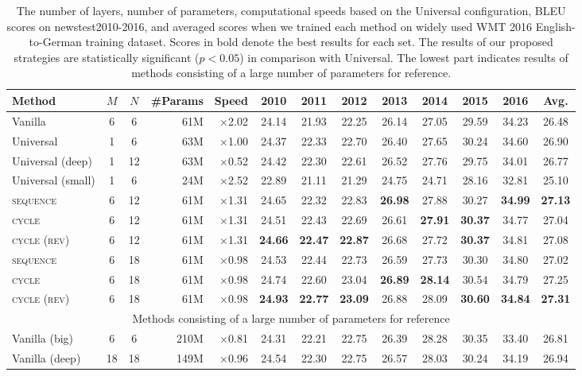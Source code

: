 \documentclass[11pt]{article}
\begin{document}
\begin{table*}[!t]
  \centering{}
  \footnotesize
  \begin{tabular}{ l | c c | r | r | c c c c c c c | c} \hline
  Method & $M$ & $N$ & \multicolumn{1}{c|}{\#Params} & Speed & 2010 & 2011 & 2012 & 2013 & 2014 & 2015 & 2016 & Avg. \\ \hline \hline
  Vanilla & 6 & 6 & 61M & $\times$2.02 & 24.14 & 21.93 & 22.25 & 26.14 & 27.05 & 29.59 & 34.23 & 26.48 \\
  Universal & 1 & 6 & 63M & $\times$1.00 & 24.37 & 22.33 & 22.70 & 26.40 & 27.65 & 30.24 & 34.60 & 26.90 \\
  Universal (deep) & 1 & 12 & 63M & $\times$0.52 & 24.42 & 22.30 & 22.61 & 26.52 & 27.76 & 29.75 & 34.01 & 26.77 \\
  Universal (small) & 1 & 6 & 24M & $\times$2.52 & 22.89 & 21.11 & 21.29 & 24.75 & 24.71 & 28.16 & 32.81 & 25.10 \\
  \textsc{sequence} & 6 & 12 & 61M & $\times$1.31 & 24.65 & 22.32 & 22.83 & \textbf{26.98} & 27.88 & 30.27 & \textbf{34.99} & \textbf{27.13} \\  
  \textsc{cycle} & 6 & 12 & 61M & $\times$1.31 & 24.51 & 22.43 & 22.69 & 26.61 & \textbf{27.91} & \textbf{30.37} & 34.77 & 27.04 \\
  \textsc{cycle (rev)} & 6 & 12 & 61M & $\times$1.31 & \textbf{24.66} & \textbf{22.47} & \textbf{22.87} & 26.68 & 27.72 & \textbf{30.37} & 34.81 & 27.08 \\ \hline
  \textsc{sequence} & 6 & 18 & 61M & $\times$0.98 & 24.53 & 22.44 & 22.73 & 26.59 & 27.73 & 30.30 & 34.80 & 27.02 \\
  \textsc{cycle} & 6 & 18 & 61M & $\times$0.98 & 24.74 & 22.60 & 23.04 & \textbf{26.89} & \textbf{28.14} & 30.54 & 34.79 & 27.25 \\
  \textsc{cycle (rev)} & 6 & 18 & 61M & $\times$0.98 & \textbf{24.93} & \textbf{22.77} & \textbf{23.09} & 26.88 & 28.09 & \textbf{30.60} & \textbf{34.84} & \textbf{27.31} \\ \hline \hline
  \multicolumn{13}{c}{Methods consisting of a large number of parameters for reference} \\ \hline \hline
  Vanilla (big) & 6 & 6 & 210M & $\times$0.81 & 24.31 & 22.21 & 22.75 & 26.39 & 28.28 & 30.35 & 33.40 & 26.81 \\
  Vanilla (deep) & 18 & 18 & 149M & $\times$0.96 & 24.54 & 22.30 & 22.75 & 26.57 & 28.03 & 30.24 & 34.19 & 26.94 \\ \hline
  \end{tabular}
  \caption{The number of layers, number of parameters, computational speeds based on the Universal configuration, BLEU scores on newstest2010-2016, and averaged scores when we trained each method on widely used WMT 2016 English-to-German training dataset. Scores in bold denote the best results for each set. The results of our proposed strategies are statistically significant ($p < 0.05$) in comparison with Universal. The lowest part indicates results of methods consisting of a large number of parameters for reference.\label{tab:exp_main_result}}
\end{table*}
\end{document}
